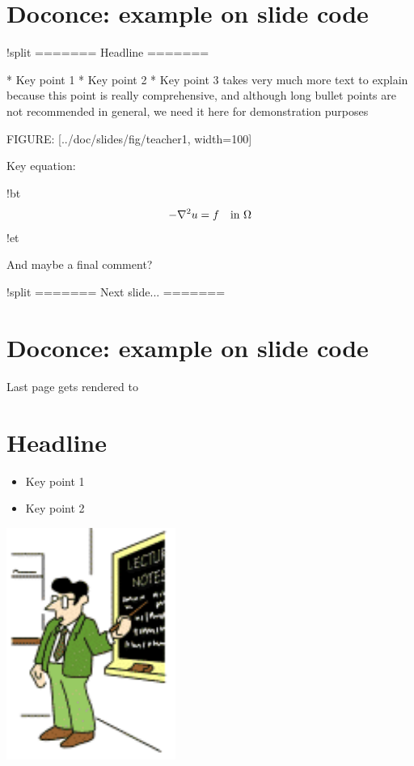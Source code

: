 \documentclass[%
oneside,                 %
final,                   %
chapterprefix=true,      %
open=right               %
10pt]{book}
\begin{document}
\section{Doconce: example on slide code}

\bccq
!split
======= Headline =======

 * Key point 1
 * Key point 2
 * Key point 3 takes very much more text to explain because
   this point is really comprehensive, and although long
   bullet points are not recommended in general, we need
   it here for demonstration purposes

FIGURE: [../doc/slides/fig/teacher1, width=100]

Key equation:

!bt
\[ -\nabla^2 u = f \quad\hbox{in }\Omega \]
!et

And maybe a final comment?

!split
======= Next slide... =======
\eccq

\section{Doconce: example on slide code}

Last page gets rendered to

\section{Headline}

\begin{itemize}
 \item Key point 1

 \item Key point 2
\end{itemize}

\noindent
\begin{center}  %
  \centerline{\includegraphics[width=0.4\linewidth]{../doc/slides/fig/teacher1.pdf}}
\end{center}
\end{document}
